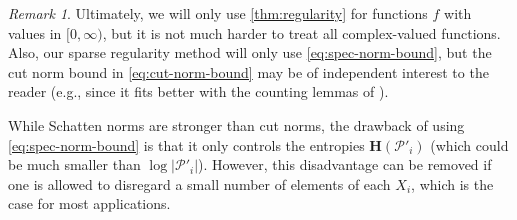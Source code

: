 \documentclass[reqno,11pt]{amsart}
\theoremstyle{definition}
\theoremstyle{remark}
\newtheorem*{remark}{Remark}
\numberwithin{equation}{section}
\renewcommand{\H}{\mathbf{H}}
\newcommand{\E}{\mathbf{E}}
\newcommand{\mP}{\mathcal{P}}
\newcommand{\one}{\mathbbm{1}}
\newcommand{\eps}{\varepsilon}
\newcommand{\sq}{_{\substack{ \\ \square}}}
\newcommand{\Hom}{\textnormal{Hom}}
\begin{document}

\begin{remark}
Ultimately, we will only use \cref{thm:regularity} for functions $f$ with values in $[0, \infty)$, but it is not much harder to treat all complex-valued functions. Also, our sparse regularity method will only use \cref{eq:spec-norm-bound}, but the cut norm bound in \cref{eq:cut-norm-bound} may be of independent interest to the reader (e.g., since it fits better with the counting lemmas of \cite{conlon2021regularity,conlon2021graphs}). 

While Schatten norms are stronger than cut norms, the drawback of using \cref{eq:spec-norm-bound} is that it only controls the entropies $\H(\mP'_i)$ (which could be much smaller than $\log |\mP'_i|$). However, this disadvantage can be removed if one is allowed to disregard a small number of elements of each $X_i$, which is the case for most applications.
\end{remark}
\end{document}
